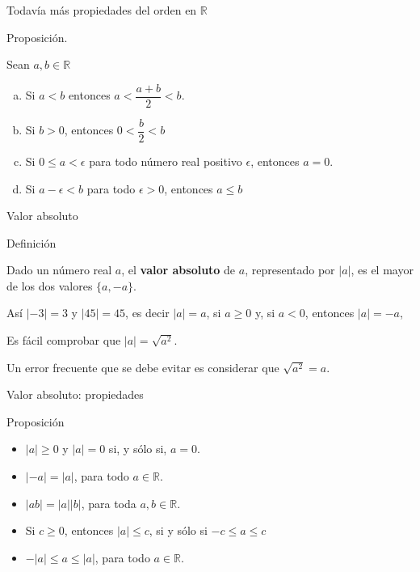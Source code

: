 \documentclass[
  ignorenonframetext,
]{beamer}
\providecommand{\tightlist}{%
  \setlength{\itemsep}{0pt}\setlength{\parskip}{0pt}}
\begin{document}
\begin{frame}{Todavía más propiedades del orden en \(\mathbb{R}\)}
\protect\hypertarget{todavuxeda-muxe1s-propiedades-del-orden-en-mathbbr}{}

Proposición.

Sean \(a,b \in \mathbb{R}\)

\begin{enumerate}
[a)]
\tightlist
\item
  Si \(a < b\) entonces \(a < \dfrac{a+b}{2} <b\).
\item
  Si \(b>0\), entonces \(0<\dfrac{b}{2} < b\)
\item
  Si \(0\leq a < \epsilon\) para todo número real positivo \(\epsilon\),
  entonces \(a=0\).
\item
  Si \(a-\epsilon < b\) para todo \(\epsilon > 0\), entonces \(a\leq b\)
\end{enumerate}

\end{frame}

\begin{frame}{Valor absoluto}
\protect\hypertarget{valor-absoluto}{}

Definición

Dado un número real \(a\), el \textbf{valor absoluto} de \(a\),
representado por \(|a|\), es el mayor de los dos valores \(\{a,-a \}\).

Así \(|-3|=3\) y \(|45|=45\), es decir \(|a| = a\), si \(a \geq 0\) y,
si \(a <0\), entonces \(|a| = -a\),

Es fácil comprobar que \(|a| = \sqrt{a^2}\).

Un error frecuente que se debe evitar es considerar que
\(\sqrt{a^2}=a\).

\end{frame}

\begin{frame}{Valor absoluto: propiedades}
\protect\hypertarget{valor-absoluto-propiedades}{}

Proposición

\begin{itemize}
\tightlist
\item
  \(|a| \geq 0\) y \(|a|=0\) si, y sólo si, \(a=0\).
\item
  \(|-a|=|a|\), para todo \(a \in \mathbb{R}\).
\item
  \(|ab|= |a||b|\), para toda \(a,b \in \mathbb{R}\).
\item
  Si \(c \geq 0\), entonces \(|a| \leq c\), si y sólo si
  \(-c \leq a \leq c\)
\item
  \(-|a| \leq a \leq |a|\), para todo \(a \in \mathbb{R}\).
\end{itemize}

\end{frame}
\end{document}
